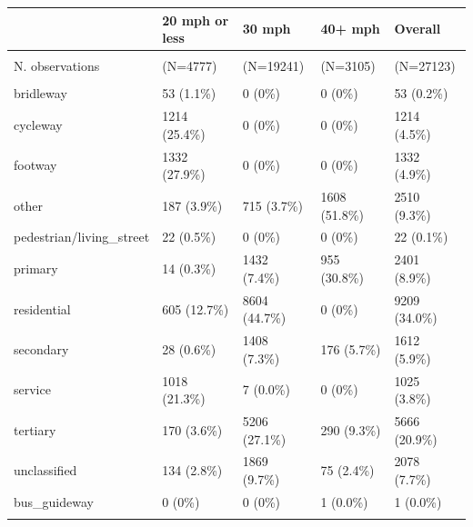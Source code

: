 \documentclass[
]{article}
\begin{document}
\begin{table}[H]
\centering
\begin{tabular}{lllll}
\toprule
 & 20 mph or less & 30 mph & 40+ mph & Overall\\
\midrule
\addlinespace[0.3em]
\multicolumn{5}{l}{\textbf{N. observations}}\\
\hspace{1em}N. observations & (N=4777) & (N=19241) & (N=3105) & (N=27123)\\
\addlinespace[0.3em]
\multicolumn{5}{l}{\textbf{Highway type}}\\
\hspace{1em}\hspace{1em}bridleway & 53 (1.1\%) & 0 (0\%) & 0 (0\%) & 53 (0.2\%)\\
\hspace{1em}cycleway & 1214 (25.4\%) & 0 (0\%) & 0 (0\%) & 1214 (4.5\%)\\
\hspace{1em}footway & 1332 (27.9\%) & 0 (0\%) & 0 (0\%) & 1332 (4.9\%)\\
\hspace{1em}other & 187 (3.9\%) & 715 (3.7\%) & 1608 (51.8\%) & 2510 (9.3\%)\\
\hspace{1em}pedestrian/living\_street & 22 (0.5\%) & 0 (0\%) & 0 (0\%) & 22 (0.1\%)\\
\hspace{1em}primary & 14 (0.3\%) & 1432 (7.4\%) & 955 (30.8\%) & 2401 (8.9\%)\\
\hspace{1em}residential & 605 (12.7\%) & 8604 (44.7\%) & 0 (0\%) & 9209 (34.0\%)\\
\hspace{1em}secondary & 28 (0.6\%) & 1408 (7.3\%) & 176 (5.7\%) & 1612 (5.9\%)\\
\hspace{1em}service & 1018 (21.3\%) & 7 (0.0\%) & 0 (0\%) & 1025 (3.8\%)\\
\hspace{1em}tertiary & 170 (3.6\%) & 5206 (27.1\%) & 290 (9.3\%) & 5666 (20.9\%)\\
\hspace{1em}unclassified & 134 (2.8\%) & 1869 (9.7\%) & 75 (2.4\%) & 2078 (7.7\%)\\
\hspace{1em}bus\_guideway & 0 (0\%) & 0 (0\%) & 1 (0.0\%) & 1 (0.0\%)\\
\addlinespace[0.3em]
\multicolumn{5}{l}{\textbf{Cycling potential}}\\

\end{tabular}
\end{table}
\end{document}
